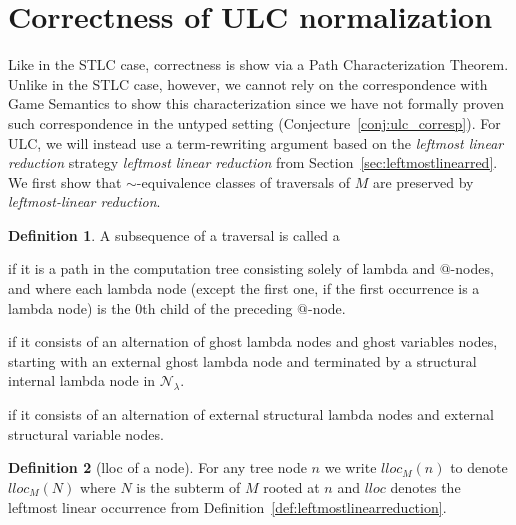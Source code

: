 \documentclass{elsarticle}
\makeatletter
\theoremstyle{plain}
\theoremstyle{definition}
\newtheorem{definition}{Definition}[section]
\theoremstyle{remark}
\newcommand\Nodes{\mathcal{N}}%
\newcommand\NodesLmd{\Nodes_\lambda}%
\renewcommand\ie{{\it i.e.\@\xspace}}
\makeatother
\begin{document}
\section{Correctness of ULC normalization}

Like in the STLC case, correctness is show via a Path Characterization Theorem.
Unlike in the STLC case, however, we cannot rely on the correspondence with Game Semantics to show this characterization since we have not formally proven such correspondence in the untyped setting (Conjecture~\ref{conj:ulc_corresp}).
For ULC, we will instead use a term-rewriting argument based on the \emph{leftmost linear reduction} strategy \emph{leftmost linear reduction} from Section~\ref{sec:leftmostlinearred}. We first show that $\sim$-equivalence classes of traversals of $M$ are preserved by \emph{leftmost-linear reduction}.

\begin{definition}
    \label{def:spinaldescent_pendingarglookup}
A subsequence of a traversal is called a
\begin{enumerate*}[nosep]
\item {} if it is a path in the computation tree consisting solely of lambda and $@$-nodes, and where each lambda node (except the first one, if the first occurrence is a lambda node) is the $0$th child of the preceding $@$-node.
\item {} if it consists of an alternation of ghost lambda nodes and ghost variables nodes, starting with an external ghost lambda node and terminated by a structural internal lambda node in $\NodesLmd$.
\item {} if it consists of an alternation of external structural lambda nodes and external structural variable nodes.
\end{enumerate*}
\end{definition}

\begin{definition}[lloc of a node]
For any tree node $n$ we write $lloc_M(n)$ to denote $lloc_M(N)$ where $N$ is the subterm of $M$ rooted at $n$ and $lloc$ denotes the leftmost linear occurrence from Definition~\ref{def:leftmostlinearreduction}.
\end{definition}
\end{document}
